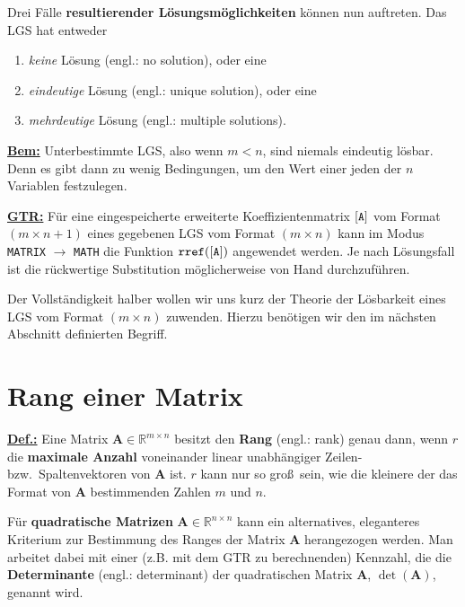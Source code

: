 \medskip
\noindent
Drei F\"alle {\bf resultierender L\"osungsm\"oglichkeiten}
k\"onnen nun auftreten. Das LGS hat entweder
%
\begin{enumerate}
\item {\em keine\/} L\"osung (engl.: no solution), oder eine

\item {\em eindeutige\/} L\"osung (engl.: unique solution), oder 
eine

\item {\em mehrdeutige\/} L\"osung (engl.: multiple solutions).
\end{enumerate}
%
\underline {\bf Bem:} Unterbestimmte LGS, also wenn $m < n$,
sind niemals eindeutig l\"osbar. Denn es gibt dann zu wenig
Bedingungen, um den Wert einer jeden der $n$ Variablen
festzulegen.

\medskip
\noindent
\underline {\bf GTR:} F\"ur eine eingespeicherte erweiterte
Koeffizientenmatrix ${\tt [A]}$ vom Format $(m \times n+1)$
eines gegebenen LGS vom Format $(m \times n)$ kann im Modus
{\tt MATRIX} $\rightarrow$ {\tt MATH} die Funktion
${\tt rref([A])}$ angewendet werden. Je nach L\"osungsfall
ist die r\"uckwertige Substitution m\"oglicherweise von
Hand durchzuf\"uhren.

\medskip
\noindent
Der Vollst\"andigkeit halber wollen wir uns kurz der Theorie
der L\"osbarkeit eines LGS vom Format $(m \times n)$ zuwenden.
Hierzu ben\"otigen wir den im n\"achsten Abschnitt definierten
Begriff.

\section[Rang einer Matrix]%
{Rang einer Matrix}

\noindent
\underline{\bf Def.:}
Eine Matrix $\mathbf{A} \in \mathbb{R}^{m \times n}$ besitzt den
{\bf Rang} (engl.: rank)
%
\be
{}
\ee
%
genau dann, wenn $r$ die {\bf maximale Anzahl} voneinander
linear unabh\"angiger Zeilen- bzw.\ Spaltenvektoren von
$\mathbf{A}$ ist. $r$ kann nur so gro\ss\ sein, wie die kleinere
der das Format von $\mathbf{A}$ bestimmenden Zahlen $m$ und $n$.

\medskip
\noindent
F\"ur {\bf quadratische Matrizen} $\mathbf{A} \in
\mathbb{R}^{n \times n}$ kann ein alternatives, eleganteres
Kriterium zur Bestimmung des Ranges der Matrix $\mathbf{A}$
herangezogen werden. Man arbeitet dabei mit einer
(z.B. mit dem GTR zu berechnenden) Kennzahl, die
die {\bf Determinante} (engl.: determinant) der quadratischen 
Matrix $\mathbf{A}$, $\det(\mathbf{A})$, genannt wird.

